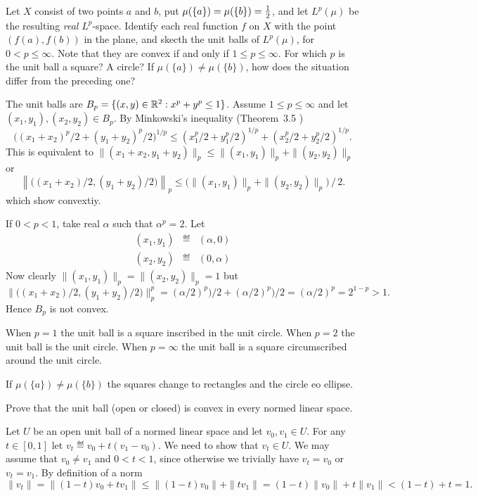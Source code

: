 \begin{enumerate}

\begin{excopy}
Let $X$ consist of two points $a$ and $b$,
put \(\mu(\{a\}) = \mu(\{b\}) = \frac{1}{2}\),
and let \(L^p(\mu)\) be the resulting \emph{real} \(L^p\)-space.
Identify each real function $f$ on $X$ with the point \((f(a),f(b))\)
in the plane, and skecth the unit balls of \(L^p(\mu)\),
for\(0<p\leq \infty\).
Note that they are convex if and only if \(1\leq p \leq \infty\).
For which $p$ is the unit ball a square? A circle?
If \(\mu(\{a\}) \neq \mu(\{b\})\), how does the situation differ from the
preceding one?
\end{excopy}

The unit balls are \(B_p=\{(x,y)\in\mathbb{R}^2: x^p + y^p \leq 1\}\).
Assume \(1\leq p \leq \infty\) and let \((x_1,y_1),(x_2,y_2)\in B_p\).
By Minkowski's inequality (Theorem~3.5 \cite{RudinRCA87})
\[
\bigl((x_1+x_2)^p/2 + (y_1+y_2)^p/2\bigr)^{1/p}
\leq
   (x_1^p/2 + y_1^p/2)^{1/p}
 + (x_2^p/2 + y_2^p/2)^{1/p}
.\]
This is equivalent to
\(\|(x_1+x_2,y_1+y_2)\|_p \leq \|(x_1,y_1)\|_p + \|(y_2,y_2)\|_p\)
or
\[\left\|\bigl((x_1+x_2)/2,(y_1+y_2)/2\bigr)\right\|_p
 \leq
 \bigl(\|(x_1,y_1)\|_p + \|(y_2,y_2)\|_p\bigr)\,/\,2.
\]
which show convextiy.

If \(0<p<1\), take real \(\alpha\) such that \(\alpha^p = 2\).
Let
\begin{eqnarray*}
(x_1,y_1) &\eqdef& (\alpha, 0) \\
(x_2,y_2) &\eqdef& (0, \alpha)
\end{eqnarray*}
Now clearly
\(\|(x_1,y_1)\|_p =  \|(x_2,y_2)\|_p = 1\)
but
\[
   \|\bigl((x_1+x_2)/2,(y_1+y_2)/2\bigr)\|_p^p
=  (\alpha/2)^p)/2 + (\alpha/2)^p)/2
=  (\alpha/2)^p
=  2^{1-p} > 1.
\]
Hence \(B_p\) is not convex.

When \(p=1\) the unit ball is a square inscribed in the unit circle.
When \(p=2\) the unit ball is the unit circle.
When \(p=\infty\) the unit ball is a square circumscribed around the unit circle.

If \(\mu(\{a\}) \neq \mu(\{b\})\) the squares change to rectangles
and the circle eo ellipse.

\begin{excopy}
Prove that the unit ball (open or closed) is convex in every normed linear space.
\end{excopy}

Let $U$ be an open unit ball of a normed linear space
and let \(v_0,v_1\in U\).
For any \(t\in[0,1]\) let \(v_t \eqdef v_0 + t(v_1 - v_0)\).
We need to show that \(v_t\in U\).
We may assume that \(v_0\neq v_1\) and \(0<t<1\), since otherwise
we trivially have \(v_t=v_0\) or \(v_t=v_1\).
By definition of a norm
\[
\|v_t\| = \|(1-t)v_0 + tv_1\|
\leq \|(1-t)v_0\| + \|tv_1\|
=     (1-t)\|v_0\| + t\|v_1\| < (1-t)+t = 1.
\]


\end{enumerate}
